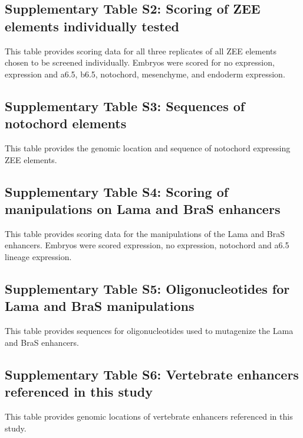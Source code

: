 \subsection{Supplementary Table S2: Scoring of ZEE elements individually tested}
This table provides scoring data for all three replicates of all ZEE elements chosen to be screened individually. Embryos were scored for no expression, expression and a6.5, b6.5, notochord, mesenchyme, and endoderm expression.

\subsection{Supplementary Table S3: Sequences of notochord elements}
This table provides the genomic location and sequence of notochord expressing ZEE elements.

\subsection{Supplementary Table S4: Scoring of manipulations on Lama and BraS enhancers}
This table provides scoring data for the manipulations of the Lama and BraS enhancers. Embryos were scored expression, no expression, notochord and a6.5 lineage expression.

\subsection{Supplementary Table S5: Oligonucleotides for Lama and BraS manipulations}
This table provides sequences for oligonucleotides used to mutagenize the Lama and BraS enhancers.

\subsection{Supplementary Table S6: Vertebrate enhancers referenced in this study}
This table provides genomic locations of vertebrate enhancers referenced in this study.
